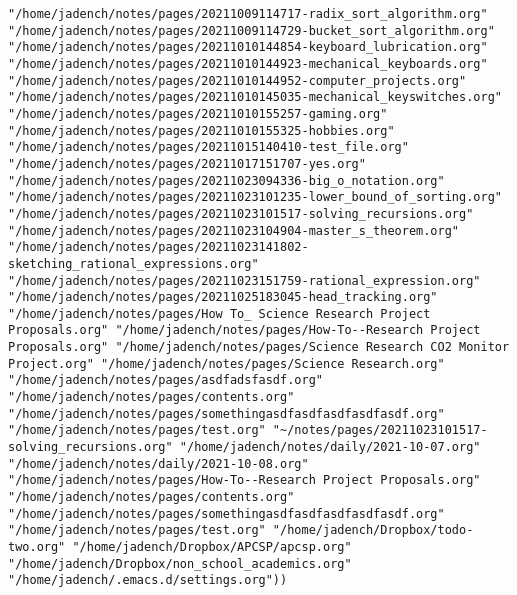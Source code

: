 \documentclass[11pt]{article}
\begin{document}
\begin{verbatim}
"/home/jadench/notes/pages/20211009114717-radix_sort_algorithm.org" "/home/jadench/notes/pages/20211009114729-bucket_sort_algorithm.org" "/home/jadench/notes/pages/20211010144854-keyboard_lubrication.org" "/home/jadench/notes/pages/20211010144923-mechanical_keyboards.org" "/home/jadench/notes/pages/20211010144952-computer_projects.org" "/home/jadench/notes/pages/20211010145035-mechanical_keyswitches.org" "/home/jadench/notes/pages/20211010155257-gaming.org" "/home/jadench/notes/pages/20211010155325-hobbies.org" "/home/jadench/notes/pages/20211015140410-test_file.org" "/home/jadench/notes/pages/20211017151707-yes.org" "/home/jadench/notes/pages/20211023094336-big_o_notation.org" "/home/jadench/notes/pages/20211023101235-lower_bound_of_sorting.org" "/home/jadench/notes/pages/20211023101517-solving_recursions.org" "/home/jadench/notes/pages/20211023104904-master_s_theorem.org" "/home/jadench/notes/pages/20211023141802-sketching_rational_expressions.org" "/home/jadench/notes/pages/20211023151759-rational_expression.org" "/home/jadench/notes/pages/20211025183045-head_tracking.org" "/home/jadench/notes/pages/How To_ Science Research Project Proposals.org" "/home/jadench/notes/pages/How-To--Research Project Proposals.org" "/home/jadench/notes/pages/Science Research CO2 Monitor Project.org" "/home/jadench/notes/pages/Science Research.org" "/home/jadench/notes/pages/asdfadsfasdf.org" "/home/jadench/notes/pages/contents.org" "/home/jadench/notes/pages/somethingasdfasdfasdfasdfasdf.org" "/home/jadench/notes/pages/test.org" "~/notes/pages/20211023101517-solving_recursions.org" "/home/jadench/notes/daily/2021-10-07.org" "/home/jadench/notes/daily/2021-10-08.org" "/home/jadench/notes/pages/How-To--Research Project Proposals.org" "/home/jadench/notes/pages/contents.org" "/home/jadench/notes/pages/somethingasdfasdfasdfasdfasdf.org" "/home/jadench/notes/pages/test.org" "/home/jadench/Dropbox/todo-two.org" "/home/jadench/Dropbox/APCSP/apcsp.org" "/home/jadench/Dropbox/non_school_academics.org" "/home/jadench/.emacs.d/settings.org"))
\end{verbatim}
\end{document}
